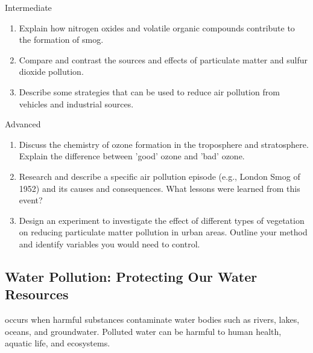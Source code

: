 \begin{tieredquestions}{Intermediate}
\begin{enumerate}
    \item Explain how nitrogen oxides and volatile organic compounds contribute to the formation of smog.
    \item Compare and contrast the sources and effects of particulate matter and sulfur dioxide pollution.
    \item Describe some strategies that can be used to reduce air pollution from vehicles and industrial sources.
\end{enumerate}
\end{tieredquestions}

\begin{tieredquestions}{Advanced}
\begin{enumerate}
    \item Discuss the chemistry of ozone formation in the troposphere and stratosphere. Explain the difference between 'good' ozone and 'bad' ozone.
    \item Research and describe a specific air pollution episode (e.g., London Smog of 1952) and its causes and consequences. What lessons were learned from this event?
    \item Design an experiment to investigate the effect of different types of vegetation on reducing particulate matter pollution in urban areas. Outline your method and identify variables you would need to control.
\end{enumerate}
\end{tieredquestions}

\subsection{Water Pollution: Protecting Our Water Resources}

 occurs when harmful substances contaminate water bodies such as rivers, lakes, oceans, and groundwater.  Polluted water can be harmful to human health, aquatic life, and ecosystems.

